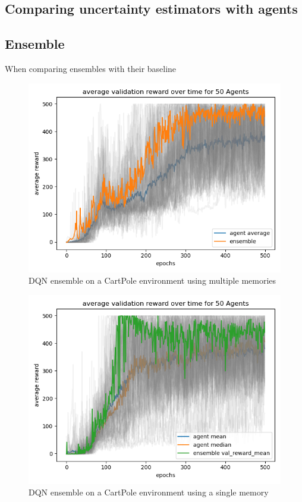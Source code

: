 \documentclass[11pt,a4paper]{article}
\begin{document}
	\subsection{Comparing uncertainty estimators with agents} \label{subsec:comparing-uncertainty-estimators-with-agents}

	\subsection{Ensemble}\label{subsec:ensemble2}
	When comparing ensembles with their baseline
	\begin{figure}
		\label{fig:ddqn_cartpole_ensemble}
		\centering
		\includegraphics[width=0.8\linewidth]{../../dqn/cartpole/ensemble/exp_39/avg_ensemble_val_rewards.png}
		\caption{DQN ensemble on a CartPole environment using multiple memories}
	\end{figure}

	\begin{figure}
		\label{fig:ddqn_cartpole_ensemble_single}
		\centering
		\includegraphics[width=0.8\linewidth]{../../dqn/cartpole/single_memory_ensemble/exp_55/avg_ensemble_val_rewards.png}
		\caption{DQN ensemble on a CartPole environment using a single memory}
	\end{figure}
\end{document}
